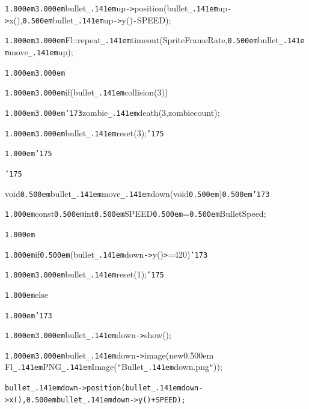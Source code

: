 \documentclass[12pt]{article}
\begin{document}
\noindent
{}{\tt\mc \kern1.000em}{\tt\mc \kern3.000em}bullet{\tt\_\kern.141em}up{\tt -}{\tt >}position(bullet{\tt\_\kern.141em}up{\tt -}{\tt >}x(),{\tt\mc \kern0.500em}bullet{\tt\_\kern.141em}up{\tt -}{\tt >}y(){\tt -}SPEED);

\noindent
{}{\tt\mc \kern1.000em}{\tt\mc \kern3.000em}Fl::repeat{\tt\_\kern.141em}timeout(SpriteFrameRate,{\tt\mc \kern0.500em}bullet{\tt\_\kern.141em}move{\tt\_\kern.141em}up);

\noindent
{}{\tt\mc \kern1.000em}{\tt\mc \kern3.000em}

\noindent
{}{\tt\mc \kern1.000em}{\tt\mc \kern3.000em}if(bullet{\tt\_\kern.141em}collision(3))

\noindent
{}{\tt\mc \kern1.000em}{\tt\mc \kern3.000em}{\tt\char'173}zombie{\tt\_\kern.141em}death(3,zombiecount);

\noindent
{}{\tt\mc \kern1.000em}{\tt\mc \kern3.000em}bullet{\tt\_\kern.141em}reset(3);{\tt\char'175}

\noindent
{}{\tt\mc \kern1.000em}{\tt\char'175}

\noindent
{}{\tt\char'175}

\noindent
{}\hfill

\noindent
{}void{\tt\mc \kern0.500em}bullet{\tt\_\kern.141em}move{\tt\_\kern.141em}down(void{\tt\mc \kern0.500em}{\tt *}){\tt\mc \kern0.500em}{\tt\char'173}

\noindent
{}{\tt\mc \kern1.000em}const{\tt\mc \kern0.500em}int{\tt\mc \kern0.500em}SPEED{\tt\mc \kern0.500em}={\tt\mc \kern0.500em}BulletSpeed;

\noindent
{}{\tt\mc \kern1.000em}

\noindent
{}{\tt\mc \kern1.000em}if{\tt\mc \kern0.500em}(bullet{\tt\_\kern.141em}down{\tt -}{\tt >}y(){\tt >}=420){\tt\char'173}

\noindent
{}{\tt\mc \kern1.000em}{\tt\mc \kern3.000em}bullet{\tt\_\kern.141em}reset(1);{\tt\char'175}

\noindent
{}{\tt\mc \kern1.000em}else

\noindent
{}{\tt\mc \kern1.000em}{\tt\char'173}

\noindent
{}{\tt\mc \kern1.000em}{\tt\mc \kern3.000em}bullet{\tt\_\kern.141em}down{\tt -}{\tt >}show();

\noindent
{}{\tt\mc \kern1.000em}{\tt\mc \kern3.000em}\rm\mc {\tt /}{\tt /}bullet{\tt\_\kern.141em}down{\tt -}{\tt >}image(new\kern0.500em Fl{\tt\_\kern.141em}PNG{\tt\_\kern.141em}Image({\tt "}Bullet{\tt\_\kern.141em}down.png{\tt "}));

\noindent
\tt\mc {\tt\mc \kern1.000em}{\tt\mc \kern3.000em}bullet{\tt\_\kern.141em}down{\tt -}{\tt >}position(bullet{\tt\_\kern.141em}down{\tt -}{\tt >}x(),{\tt\mc \kern0.500em}bullet{\tt\_\kern.141em}down{\tt -}{\tt >}y()+SPEED);
\end{document}
